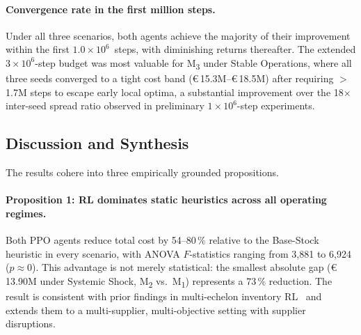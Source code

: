 \documentclass[preprint,12pt]{elsarticle}
\begin{document}
\paragraph{Convergence rate in the first million steps.}
Under all three scenarios, both agents achieve the majority of their improvement within the first $1.0\!\times\!10^{6}$~steps, with diminishing returns thereafter.
The extended $3\!\times\!10^{6}$-step budget was most valuable for M\textsubscript{3} under Stable Operations, where all three seeds converged to a tight cost band (\euro\,15.3M--\euro\,18.5M) after requiring $>$\,1.7M steps to escape early local optima, a substantial improvement over the 18$\times$ inter-seed spread ratio observed in preliminary $1\!\times\!10^{6}$-step experiments.

\subsection{Discussion and Synthesis}
\label{sec:synthesis}

The results cohere into three empirically grounded propositions.

\paragraph{Proposition 1: RL dominates static heuristics across all operating regimes.}
Both PPO agents reduce total cost by 54--80\,\% relative to the Base-Stock heuristic in every scenario, with ANOVA $F$-statistics ranging from 3{,}881 to 6{,}924 ($p \approx 0$).
This advantage is not merely statistical: the smallest absolute gap (\euro\,13.90M under Systemic Shock, M\textsubscript{2} vs.\ M\textsubscript{1}) represents a 73\,\% reduction.
The result is consistent with prior findings in multi-echelon inventory RL~\citep{Wang_etal_2022,Li_etal_2024} and extends them to a multi-supplier, multi-objective setting with supplier disruptions.
\end{document}
